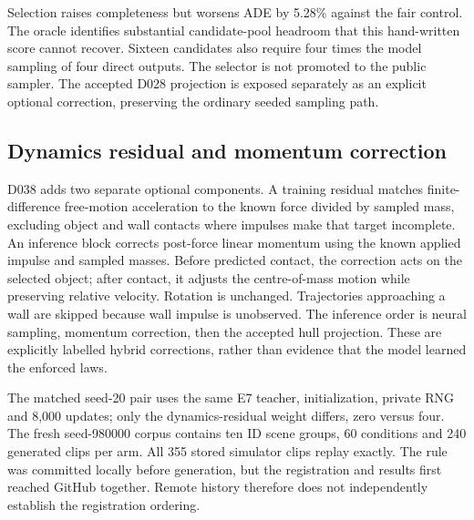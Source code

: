 Selection raises completeness but worsens ADE by 5.28\% against the fair
control. The oracle identifies substantial candidate-pool headroom that this
hand-written score cannot recover. Sixteen candidates also require four times
the model sampling of four direct outputs. The selector is not promoted to
the public sampler. The accepted D028 projection is exposed separately as an
explicit optional correction, preserving the ordinary seeded sampling path.

\subsection{Dynamics residual and momentum correction}
\label{sec:dynamics-residual}
D038 adds two separate optional components. A training residual matches
finite-difference free-motion acceleration to the known force divided by
sampled mass, excluding object and wall contacts where impulses make that
target incomplete. An inference block corrects post-force linear momentum
using the known applied impulse and sampled masses. Before predicted contact,
the correction acts on the selected object; after contact, it adjusts the
centre-of-mass motion while preserving relative velocity. Rotation is
unchanged. Trajectories approaching a wall are skipped because wall impulse
is unobserved. The inference order is neural sampling, momentum correction,
then the accepted hull projection. These are explicitly labelled hybrid
corrections, rather than evidence that the model learned the enforced laws.

The matched seed-20 pair uses the same E7 teacher, initialization, private RNG
and 8,000 updates; only the dynamics-residual weight differs, zero versus four.
The fresh seed-980000 corpus contains ten ID scene groups, 60 conditions and
240 generated clips per arm. All 355 stored simulator clips replay exactly.
The rule was committed locally before generation, but the registration and
results first reached GitHub together. Remote history therefore does not
independently establish the registration ordering.

